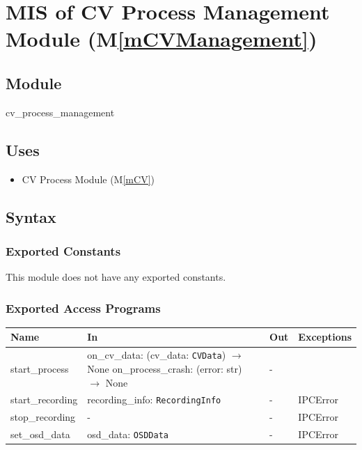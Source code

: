 \documentclass[12pt, titlepage]{article}
\newcommand{\mref}[1]{M\ref{#1}}
\begin{document}
\section{MIS of CV Process Management Module (\mref{mCVManagement})}

\subsection{Module}

cv\_process\_management

\subsection{Uses}

\begin{itemize}
  \item CV Process Module (\mref{mCV})
\end{itemize}

\subsection{Syntax}

\subsubsection{Exported Constants}

This module does not have any exported constants.

\subsubsection{Exported Access Programs}

\begin{center}
  \begin{tabular}{p{3cm} p{6cm} p{2cm} p{3.5cm}}
    \hline
    \textbf{Name}    & \textbf{In}                                                                                                               & \textbf{Out} & \textbf{Exceptions} \\
    \hline
    start\_process   & on\_cv\_data: (cv\_data: \texttt{CVData}) $\rightarrow$ None \newline on\_process\_crash: (error: str) $\rightarrow$ None & -            &                     \\
    \hline
    start\_recording & recording\_info: \texttt{RecordingInfo}                                                                                   & -            & IPCError            \\
    \hline
    stop\_recording  & -                                                                                                                         & -            & IPCError            \\
    \hline
    set\_osd\_data   & osd\_data: \texttt{OSDData}                                                                                               & -            & IPCError            \\
    \hline
  \end{tabular}
\end{center}
\end{document}
